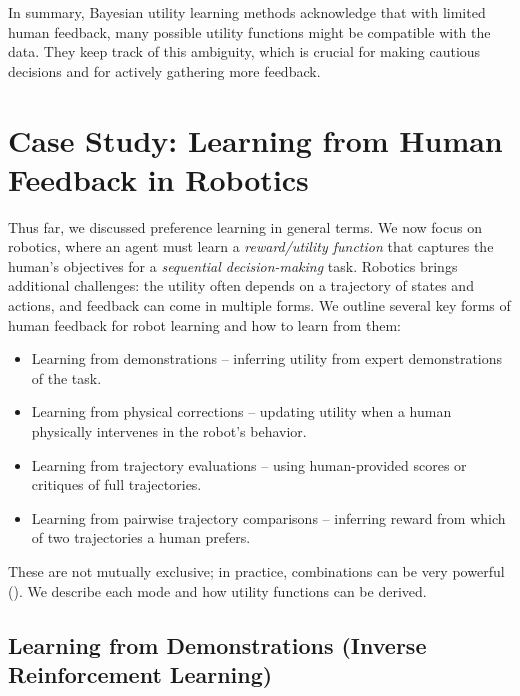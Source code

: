 \documentclass[
  letterpaper,
  numbers=noenddot,
  DIV=11]{scrreprt}
\providecommand{\tightlist}{%
  \setlength{\itemsep}{0pt}\setlength{\parskip}{0pt}}\usepackage{longtable,booktabs,array}
\theoremstyle{plain}
\theoremstyle{definition}
\theoremstyle{remark}
\begin{document}
In summary, Bayesian utility learning methods acknowledge that with
limited human feedback, many possible utility functions might be
compatible with the data. They keep track of this ambiguity, which is
crucial for making cautious decisions and for actively gathering more
feedback.

\section*{Case Study: Learning from Human Feedback in
Robotics}\label{case-study-learning-from-human-feedback-in-robotics}


Thus far, we discussed preference learning in general terms. We now
focus on robotics, where an agent must learn a \emph{reward/utility
function} that captures the human's objectives for a \emph{sequential
decision-making} task. Robotics brings additional challenges: the
utility often depends on a trajectory of states and actions, and
feedback can come in multiple forms. We outline several key forms of
human feedback for robot learning and how to learn from them:

\begin{itemize}
\tightlist
\item
  Learning from demonstrations -- inferring utility from expert
  demonstrations of the task.
\item
  Learning from physical corrections -- updating utility when a human
  physically intervenes in the robot's behavior.
\item
  Learning from trajectory evaluations -- using human-provided scores or
  critiques of full trajectories.
\item
  Learning from pairwise trajectory comparisons -- inferring reward from
  which of two trajectories a human prefers.
\end{itemize}

These are not mutually exclusive; in practice, combinations can be very
powerful
(). We
describe each mode and how utility functions can be derived.

\subsection*{Learning from Demonstrations (Inverse Reinforcement
Learning)}\label{learning-from-demonstrations-inverse-reinforcement-learning}
\end{document}
